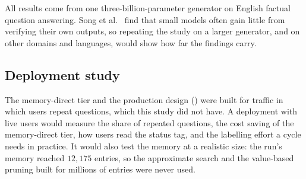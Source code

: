 All results come from one three-billion-parameter generator on English factual question answering. Song et al.~\cite{song2024gap} find that small models often gain little from verifying their own outputs, so repeating the study on a larger generator, and on other domains and languages, would show how far the findings carry.

\subsection{Deployment study}
\label{sec:future-deployment}

The memory-direct tier and the production design () were built for traffic in which users repeat questions, which this study did not have. A deployment with live users would measure the share of repeated questions, the cost saving of the memory-direct tier, how users read the status tag, and the labelling effort a cycle needs in practice. It would also test the memory at a realistic size: the run's memory reached $12{,}175$ entries, so the approximate search and the value-based pruning built for millions of entries were never used.
